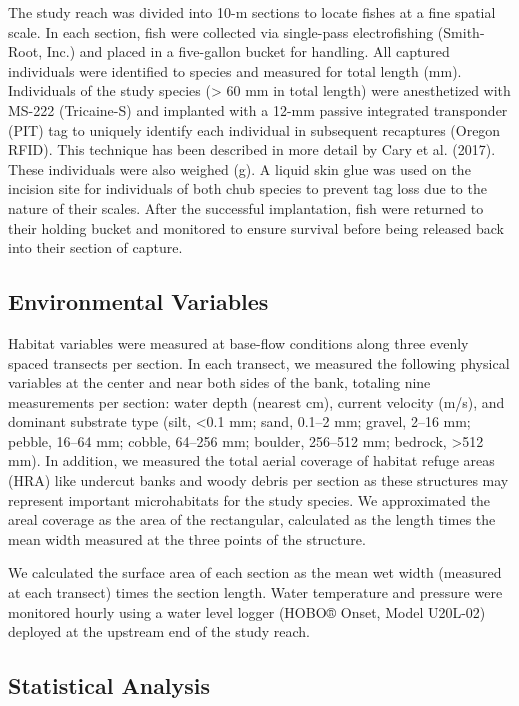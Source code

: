 \documentclass[11pt, class=article, crop=false]{standalone}
\begin{document}
The study reach was divided into 10-m sections to locate fishes at a fine spatial scale. In each section, fish were collected via single-pass electrofishing (Smith-Root, Inc.) and placed in a five-gallon bucket for handling. All captured individuals were identified to species and measured for total length (mm). Individuals of the study species (> 60 mm in total length) were anesthetized with MS-222 (Tricaine-S) and implanted with a 12-mm passive integrated transponder (PIT) tag to uniquely identify each individual in subsequent recaptures (Oregon RFID). This technique has been described in more detail by Cary et al. (2017). These individuals were also weighed (g). A liquid skin glue was used on the incision site for individuals of both chub species to prevent tag loss due to the nature of their scales. After the successful implantation, fish were returned to their holding bucket and monitored to ensure survival before being released back into their section of capture. 

\subsection{Environmental Variables}

Habitat variables were measured at base-flow conditions along three evenly spaced transects per section. In each transect, we measured the following physical variables at the center and near both sides of the bank, totaling nine measurements per section: water depth (nearest cm), current velocity (m/s), and dominant substrate type (silt, <0.1 mm; sand, 0.1--2 mm; gravel, 2--16 mm; pebble, 16--64 mm; cobble, 64--256 mm; boulder, 256--512 mm; bedrock, >512 mm). In addition, we measured the total aerial coverage of habitat refuge areas (HRA) like undercut banks and woody debris per section as these structures may represent important microhabitats for the study species. We approximated the areal coverage as the area of the rectangular, calculated as the length times the mean width measured at the three points of the structure.

We calculated the surface area of each section as the mean wet width (measured at each transect) times the section length. Water temperature and pressure were monitored hourly using a water level logger (HOBO® Onset, Model U20L-02) deployed at the upstream end of the study reach.

\subsection{Statistical Analysis}
\end{document}
